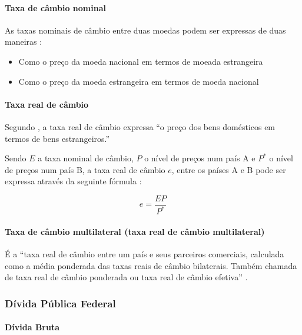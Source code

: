 \documentclass[]{article}
\providecommand{\tightlist}{%
  \setlength{\itemsep}{0pt}\setlength{\parskip}{0pt}}
\let\oldparagraph\paragraph
\renewcommand{\paragraph}[1]{\oldparagraph{#1}\mbox{}}
\begin{document}
\paragraph{Taxa de câmbio nominal}\label{taxa-de-cambio-nominal}

As taxas nominais de câmbio entre duas moedas podem ser expressas de
duas maneiras \cite[p.~354]{blanchard}:

\begin{itemize}
\tightlist
\item
  Como o preço da moeda nacional em termos de moeada estrangeira
\item
  Como o preço da moeda estrangeira em termos de moeda nacional
\end{itemize}

\paragraph{Taxa real de câmbio}\label{taxa-real-de-cambio}

Segundo \cite[p.~356]{blanchard}, a taxa real de câmbio expressa ``o
preço dos bens domésticos em termos de bens estrangeiros.''

Sendo \(E\) a taxa nominal de câmbio, \(P\) o nível de preços num país A
e \(P^*\) o nível de preços num país B, a taxa real de câmbio \(e\),
entre os países A e B pode ser expressa através da seguinte fórmula
\cite[p.~356]{blanchard}:

\[e = \frac{EP}{P^*}\]

\paragraph{Taxa de câmbio multilateral (taxa real de câmbio
multilateral)}\label{taxa-de-cambio-multilateral-taxa-real-de-cambio-multilateral}

É a ``taxa real de câmbio entre um país e seus parceiros comerciais,
calculada como a média ponderada das taxas reais de câmbio bilaterais.
Também chamada de taxa real de câmbio ponderada ou taxa real de câmbio
efetiva'' \cite[p.~583]{blanchard}.

\subsubsection{Dívida Pública Federal}\label{divida-publica-federal}

\paragraph{Dívida Bruta}\label{divida-bruta}
\end{document}
